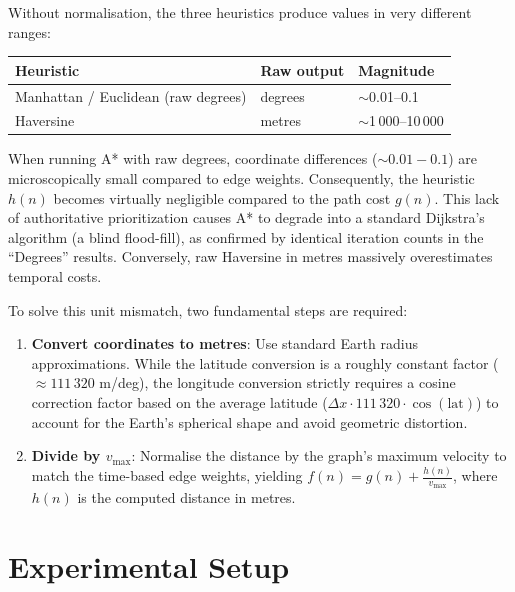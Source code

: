 \documentclass[12pt,a4paper]{article}
\begin{document}
Without normalisation, the three heuristics produce values in very different ranges:
\begin{center}
\begin{tabular}{lll}
  \toprule
  \textbf{Heuristic} & \textbf{Raw output} & \textbf{Magnitude} \\
  \midrule
  Manhattan / Euclidean (raw degrees) & degrees & $\sim$0.01--0.1 \\
  Haversine & metres & $\sim$1\,000--10\,000 \\
  \bottomrule
\end{tabular}
\end{center}

When running A* with raw degrees, coordinate differences ($\sim 0.01 - 0.1$) are microscopically small compared to edge weights. Consequently, the heuristic $h(n)$ becomes virtually negligible compared to the path cost $g(n)$. This lack of authoritative prioritization causes A* to degrade into a standard Dijkstra's algorithm (a blind flood-fill), as confirmed by identical iteration counts in the ``Degrees'' results. Conversely, raw Haversine in metres massively overestimates temporal costs.

To solve this unit mismatch, two fundamental steps are required:
\begin{enumerate}
  \item \textbf{Convert coordinates to metres}: Use standard Earth radius approximations. While the latitude conversion is a roughly constant factor ($\approx 111\,320$ m/deg), the longitude conversion strictly requires a cosine correction factor based on the average latitude ($\Delta x \cdot 111\,320 \cdot \cos(\text{lat})$) to account for the Earth's spherical shape and avoid geometric distortion.
  \item \textbf{Divide by $v_{\max}$}: Normalise the distance by the graph's maximum velocity to match the time-based edge weights, yielding $f(n) = g(n) + \frac{h(n)}{v_{\max}}$, where $h(n)$ is the computed distance in metres.
\end{enumerate}


\section{Experimental Setup}
\end{document}
